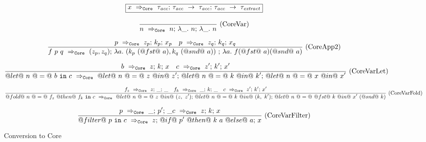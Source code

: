 
\begin{figure*}

\newcommand \acc {\tau_\mathit{acc}}
\newcommand \xtr {\tau_\mathit{extract}}
\newcommand \lam[1] {\lambda{} #1.~}

$$
\boxed{\ToCore{x}{\acc}{\acc~\to~\acc}{\acc~\to~\xtr}}
$$


$$
\ruleI
{
}
{ 
    \ToCore{n}{n}{\lam{\_} n}{\lam{\_} n}
}
\textrm{(CoreVar)}
$$

$$
\ruleI
{
    \ToCore{p}{z_p}{k_p}{x_p}
    \quad
    \ToCore{p}{z_q}{k_q}{x_q}
}
{ 
    \ToCore{f~p~q}{(z_p, z_q)}{\lam{a} (k_p~(@fst@~a), k_q~(@snd@~a))~}{\lam{a} f (@fst@~a) (@snd@~a)}
}
\textrm{(CoreApp2)}
$$

$$
\frac {\displaystyle 
    b ~\Rightarrow_{\mathtt{Core}}~ z\mathtt{;}~k\mathtt{;}~x
    \quad
    c ~\Rightarrow_{\mathtt{Core}}~ z'\mathtt{;}~k'\mathtt{;}~x'
} {\displaystyle  
    @let@~n~@=@~b~\mathtt{in}~c ~\Rightarrow_{\mathtt{Core}}~ @let@~n~@=@~z~@in@~z'\mathtt{;}~@let@~n~@=@~k~@in@~k'\mathtt{;}~@let@~n~@=@~x~@in@~x'
} \ 
\textrm{(CoreVarLet)}
$$

$$
\frac {\displaystyle 
    f_z ~\Rightarrow_{\mathtt{Core}}~ z\mathtt{;}~\_\mathtt{;}~\_
    \quad
    f_k ~\Rightarrow_{\mathtt{Core}}~ \_\mathtt{;}~k\mathtt{;}~\_
    \quad
    c ~\Rightarrow_{\mathtt{Core}}~ z'\mathtt{;}~k'\mathtt{;}~x'
} {\displaystyle  
    @fold@~n~@=@~f_z~@then@~f_k~\mathtt{in}~c ~\Rightarrow_{\mathtt{Core}}~ @let@~n~@=@~z~@in@~(z,~z')\mathtt{;}~@let@~n~@=@~k~@in@~(k,~k')\mathtt{;}~@let@~n~@=@~@fst@~k~@in@~x'~(@snd@~k)
} \ 
\textrm{(CoreVarFold)}
$$

$$
\frac {\displaystyle 
    p ~\Rightarrow_{\mathtt{Core}}~ \_\mathtt{;}~p'\mathtt{;}~\_
    c ~\Rightarrow_{\mathtt{Core}}~ z\mathtt{;}~k\mathtt{;}~x
} {\displaystyle  
    @filter@~p~\mathtt{in}~c ~\Rightarrow_{\mathtt{Core}}~ z\mathtt{;}~@if@~p'~@then@~k~a~@else@~a\mathtt{;}~x
} \ 
\textrm{(CoreVarFilter)}
$$



\caption{Conversion to Core}
\label{fig:source:core}
\end{figure*}


